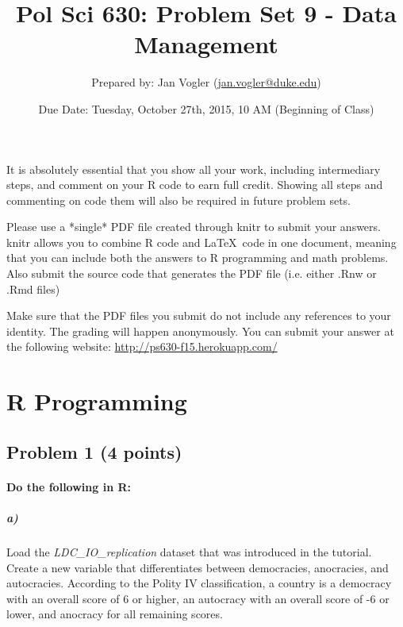 \documentclass[12pt]{article}
\begin{document}
\title{Pol Sci 630: Problem Set 9 - Data Management}

\author{Prepared by: Jan Vogler (\href{mailto:jan.vogler@duke.edu}{jan.vogler@duke.edu})}

\date{Due Date: Tuesday, October 27th, 2015, 10 AM (Beginning of Class)}
 
\maketitle 



It is absolutely essential that you show all your work, including intermediary steps, and comment on your R code to earn full credit. Showing all steps and commenting on code them will also be required in future problem sets.

Please use a *single* PDF file created through knitr to submit your answers. knitr allows you to combine R code and \LaTeX \ code in one document, meaning that you can include both the answers to R programming and math problems. Also submit the source code that generates the PDF file (i.e. either .Rnw or .Rmd files)

Make sure that the PDF files you submit do not include any references to your identity. The grading will happen anonymously. You can submit your answer at the following website: \url{http://ps630-f15.herokuapp.com/}



\section*{R Programming}

\subsection*{Problem 1 (4 points)}

\paragraph{Do the following in R:}

\subparagraph{a)} Load the \textit{LDC\_IO\_replication} dataset that was introduced in the tutorial. Create a new variable that differentiates between democracies, anocracies, and autocracies. According to the Polity IV classification, a country is a democracy with an overall score of 6 or higher, an autocracy with an overall score of -6 or lower, and anocracy for all remaining scores.
\end{document}
